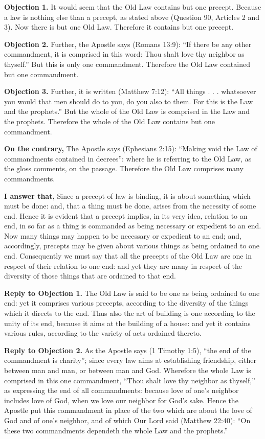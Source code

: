 
\textbf{Objection 1.} It would seem that the Old Law contains but one precept. Because a law is nothing else than a precept, as stated above (Question 90, Articles 2 and 3). Now there is but one Old Law. Therefore it contains but one precept.

\textbf{Objection 2.} Further, the Apostle says (Romans 13:9): ``If there be any other commandment, it is comprised in this word: Thou shalt love thy neighbor as thyself.'' But this is only one commandment. Therefore the Old Law contained but one commandment.

\textbf{Objection 3.} Further, it is written (Matthew 7:12): ``All things . . . whatsoever you would that men should do to you, do you also to them. For this is the Law and the prophets.'' But the whole of the Old Law is comprised in the Law and the prophets. Therefore the whole of the Old Law contains but one commandment.

\textbf{On the contrary,} The Apostle says (Ephesians 2:15): ``Making void the Law of commandments contained in decrees'': where he is referring to the Old Law, as the gloss comments, on the passage. Therefore the Old Law comprises many commandments.

\textbf{I answer that,} Since a precept of law is binding, it is about something which must be done: and, that a thing must be done, arises from the necessity of some end. Hence it is evident that a precept implies, in its very idea, relation to an end, in so far as a thing is commanded as being necessary or expedient to an end. Now many things may happen to be necessary or expedient to an end; and, accordingly, precepts may be given about various things as being ordained to one end. Consequently we must say that all the precepts of the Old Law are one in respect of their relation to one end: and yet they are many in respect of the diversity of those things that are ordained to that end.

\textbf{Reply to Objection 1.} The Old Law is said to be one as being ordained to one end: yet it comprises various precepts, according to the diversity of the things which it directs to the end. Thus also the art of building is one according to the unity of its end, because it aims at the building of a house: and yet it contains various rules, according to the variety of acts ordained thereto.

\textbf{Reply to Objection 2.} As the Apostle says (1 Timothy 1:5), ``the end of the commandment is charity''; since every law aims at establishing friendship, either between man and man, or between man and God. Wherefore the whole Law is comprised in this one commandment, ``Thou shalt love thy neighbor as thyself,'' as expressing the end of all commandments: because love of one's neighbor includes love of God, when we love our neighbor for God's sake. Hence the Apostle put this commandment in place of the two which are about the love of God and of one's neighbor, and of which Our Lord said (Matthew 22:40): ``On these two commandments dependeth the whole Law and the prophets.''


